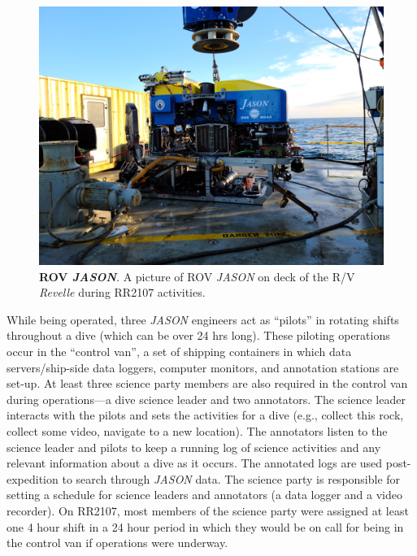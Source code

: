 \begin{figure}[h!]
  \centering
  \includegraphics[width=0.8\columnwidth]{figures/ops_jason.jpg}
  \caption[ROV \emph{JASON}]{\textbf{ROV \emph{JASON}}. A picture of ROV \emph{JASON} on deck of the R/V \emph{Revelle} during RR2107 activities.}
  \label{fig:ops_jason}
\end{figure}

While being operated, three \emph{JASON} engineers act as ``pilots'' in rotating shifts throughout a dive (which can be over 24 hrs long). These piloting operations occur in the ``control van'', a set of shipping containers in which data servers/ship-side data loggers, computer monitors, and annotation stations are set-up. At least three science party members are also required in the control van during operations---a dive science leader and two annotators. The science leader interacts with the pilots and sets the activities for a dive (e.g., collect this rock, collect some video, navigate to a new location). The annotators listen to the science leader and pilots to keep a running log of science activities and any relevant information about a dive as it occurs. The annotated logs are used post-expedition to search through \emph{JASON} data. The science party is responsible for setting a schedule for science leaders and annotators (a data logger and a video recorder). On RR2107, most members of the science party were assigned at least one 4 hour shift in a 24 hour period in which they would be on call for being in the control van if operations were underway.

